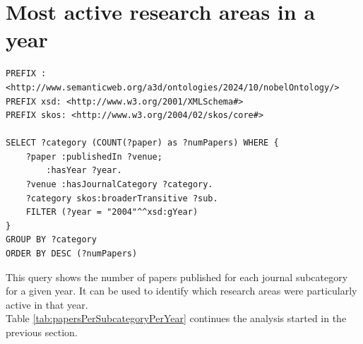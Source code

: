 \documentclass{article}
\begin{document}
\section{Most active research areas in a year} \label{moreActiveResearchAreas}
\begin{lstlisting}
PREFIX : <http://www.semanticweb.org/a3d/ontologies/2024/10/nobelOntology/>
PREFIX xsd: <http://www.w3.org/2001/XMLSchema#>
PREFIX skos: <http://www.w3.org/2004/02/skos/core#>

SELECT ?category (COUNT(?paper) as ?numPapers) WHERE {
    ?paper :publishedIn ?venue;
        :hasYear ?year.
    ?venue :hasJournalCategory ?category.
    ?category skos:broaderTransitive ?sub.
    FILTER (?year = "2004"^^xsd:gYear)
}
GROUP BY ?category
ORDER BY DESC (?numPapers)
\end{lstlisting}

This query shows the number of papers published for each journal subcategory for a given year.
It can be used to identify which research areas were particularly active in that year.\\
Table \ref{tab:papersPerSubcategoryPerYear} continues the analysis started in the previous section.
\end{document}
